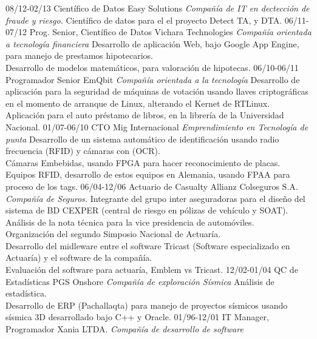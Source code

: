 \begin{entrylist}
  \entry
    {08/12-02/13}
    {Científico de Datos}
    {Easy Solutions {\sl Compañía de IT en dectección de fraude y riesgo.}}
    {Científico de datos para el el proyecto Detect TA, y DTA.}
  \entry
    {06/11-07/12}
    {Prog. Senior, Científico de Datos}
    {Vichara Technologies {\sl Compañía orientada a tecnología financiera}}
    {Desarrollo de aplicación Web, bajo Google App Engine, para manejo de prestamos hipotecarios.\\
     Desarrollo de modelos matemáticos, para valoración de hipotecas.}
  \entry
    {06/10-06/11}
    {Programador Senior}
    {EmQbit {\sl Compañía orientada a la tecnología}}
    {Desarrollo de aplicación para la seguridad de máquinas de votación usando llaves criptográficas
     en el momento de arranque de Linux, alterando el Kernet de RTLinux.\\
     Aplicación para el auto préstamo de libros, en la librería de la Universidad Nacional.}
  \entry
    {01/07-06/10}
    {CTO}
    {Mig Internacional {\sl Emprendimiento en Tecnología de punta}}
    {Desarrollo de un sistema automático de identificación usando radio frecuencia (RFID) y cámaras con (OCR).\\
     Cámaras Embebidas, usando FPGA para hacer reconocimiento de placas.\\
     Equipos RFID, desarrollo de estos equipos en Alemania, usando FPAA para proceso de los tags.}
  \entry
    {06/04-12/06}
    {Actuario de Casualty}
    {Allianz Colseguros S.A. {\sl Compañía de Seguros.}}
    {Integrante del grupo inter aseguradoras para el diseño del sistema de BD CEXPER (central de riesgo en pólizas de vehículo y SOAT).\\
     Análisis de la nota técnica para la vice presidencia de automóviles.\\
     Organización del segundo Simposio Nacional de Actuaría.\\
     Desarrollo del midleware entre el software Tricast (Software especializado en Actuaría) y el software de la compañía.\\
     Evaluación del software para actuaría, Emblem vs Tricast.}
  \entry
    {12/02-01/04}
    {QC de Estadísticas}
    {PGS Onshore {\sl Compañía de exploración Sísmica}}
    {Análisis de estadística.\\
     Desarrollo de ERP (Pachallaqta) para manejo de proyectos sísmicos usando sísmica 3D desarrollado bajo C++ y Oracle.}
  \entry
    {01/96-12/01}
    {IT Manager, Programador}
    {Xania LTDA. {\sl Compañía de desarrollo de software}}

\end{entrylist}

